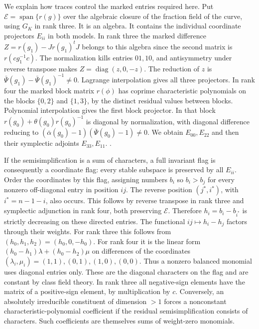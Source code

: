 We explain how traces control the marked entries required here. Put
\(\mathcal E=\operatorname{span}\{r(g)\}\) over the algebraic
closure of the fraction field of the curve, using \(G_K\) in rank
three. It is an algebra. It contains the individual coordinate
projectors \(E_{ii}\) in both models. In rank three the marked
difference \(Z=r(g_1)-Jr(g_1)^tJ\) belongs to this algebra since
the second matrix is \(r(cg_1^{-1}c)\). The normalization kills
entries \(01,10\), and antisymmetry under reverse transpose makes
\(Z=\operatorname{diag}(z,0,-z)\). The reduction of \(z\) is
\(\bar\Psi(g_1)-\bar\Psi(g_1)^{-1}\ne0\). Lagrange interpolation
gives all three projectors. In rank four the marked block matrix
\(r(\phi)\) has coprime characteristic polynomials on the blocks
\(\{0,2\}\) and \(\{1,3\}\), by the distinct residual values
between blocks. Polynomial interpolation gives the first block
projector. In that block \(r(g_0)+\theta(g_0)r(g_0)^{-1}\) is
diagonal by normalization, with diagonal difference reducing to
\((\bar\alpha(g_0)-1)(\bar\Psi(g_0)-1)\ne0\). We obtain
\(E_{00},E_{22}\) and then their symplectic adjoints \(E_{33},E_{11}\).
.

If the semisimplification is a sum of characters, a full invariant
flag is consequently a coordinate flag: every stable subspace is
preserved by all \(E_{ii}\). Order the coordinates by this flag,
assigning numbers \(b_i\) so \(b_i>b_j\) for every nonzero
off-diagonal entry in position \(ij\). The reverse position
\((j^*,i^*)\), with \(i^*=n-1-i\), also occurs. This follows by
reverse transpose in rank three and symplectic adjunction in rank
four, both preserving \(\mathcal E\). Therefore \(h_i=b_i-b_{i^*}\)
is strictly decreasing on these directed entries. The functional
\(ij\mapsto h_i-h_j\) factors through their weights. For rank three
this follows from \((h_0,h_1,h_2)=(h_0,0,-h_0)\). For rank four it
is the linear form \((h_0-h_1)\lambda+(h_0-h_2)\mu\) on differences
of the coordinates \((\lambda_i,\mu_i)=(1,1),(0,1),(1,0),(0,0)\).
Thus a nonzero balanced monomial uses diagonal entries only. These
are the diagonal characters on the flag and are constant by class
field theory. In rank three all negative-sign elements have the
matrix of a positive-sign element, by multiplication by \(c\).
Conversely, an absolutely irreducible constituent of dimension \(>1\)
forces a nonconstant characteristic-polynomial coefficient if the
residual semisimplification consists of characters. Such coefficients
are themselves sums of weight-zero monomials.

